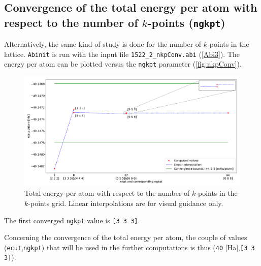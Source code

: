 \documentclass[11pt,a4paper]{article}
\begin{document}
\subsection{Convergence of the total energy per atom with respect to the number of $k$-points (\texttt{ngkpt})}
\label{convEtotNkpt}
Alternatively, the same kind of study is done for the number of $k$-points in the lattice. \texttt{Abinit} is run with the input file \texttt{1522\_2\_nkpConv.abi} (\autoref{Abi3}). The energy per atom can be plotted versus the \texttt{ngkpt} parameter (\autoref{fig:nkpConv}).
\begin{figure}[H]
\includegraphics[width=\textwidth]{images/etotngkpt.png}
\caption{Total energy per atom with respect to the number of $k$-points in the $k$-points grid.
Linear interpolations are for visual guidance only.}
\label{fig:nkpConv}
\end{figure}
The first converged \texttt{ngkpt} value is \texttt{[3 3 3]}.

Concerning the convergence of the total energy per atom, the couple of values (\texttt{ecut},\texttt{ngkpt}) that will be used in the further computations is thus (\texttt{40} [Ha],\texttt{[3 3 3]}).
\end{document}
